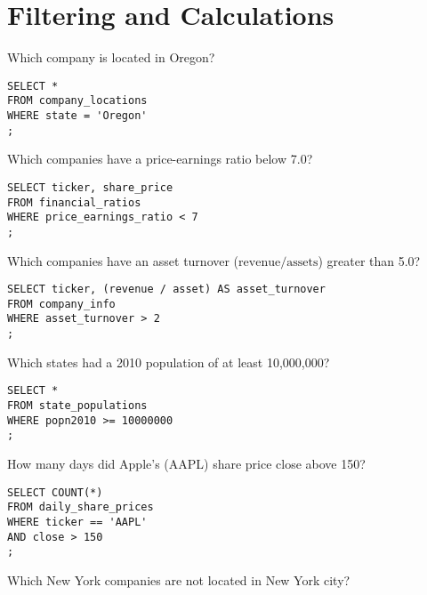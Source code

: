 \documentclass[10pt]{exam}
\begin{document}
\section{Filtering and Calculations}
\begin{questions}


\question Which company is located in Oregon?

\begin{solution}
\begin{lstlisting}
SELECT *
FROM company_locations
WHERE state = 'Oregon'
;
\end{lstlisting}
\end{solution}


\question Which companies have a price-earnings ratio below 7.0?

\begin{solution}
\begin{lstlisting}
SELECT ticker, share_price
FROM financial_ratios
WHERE price_earnings_ratio < 7
;
\end{lstlisting}
\end{solution}


\question Which companies have an asset turnover ($\textrm{revenue} /
\textrm{assets}$) greater than 5.0?

\begin{solution}
\begin{lstlisting}
SELECT ticker, (revenue / asset) AS asset_turnover
FROM company_info
WHERE asset_turnover > 2
;
\end{lstlisting}
\end{solution}


\question Which states had a 2010 population of at least 10,000,000?

\begin{solution}
\begin{lstlisting}
SELECT *
FROM state_populations
WHERE popn2010 >= 10000000
;
\end{lstlisting}
\end{solution}


\question How many days did Apple's (AAPL) share price close above 150?

\begin{solution}
\begin{lstlisting}
SELECT COUNT(*)
FROM daily_share_prices
WHERE ticker == 'AAPL'
AND close > 150
;
\end{lstlisting}
\end{solution}


\question Which New York companies are not located in New York city?


\end{questions}
\end{document}
